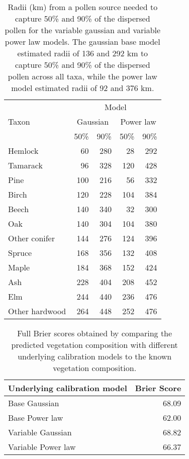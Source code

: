 \begin{table}
\begin{center}
\begin{tabular}{lrrrr} 
\toprule
      & \multicolumn{4}{c}{Model} \\  \cmidrule(lr){2-5}
Taxon & \multicolumn{2}{c}{Gaussian} & \multicolumn{2}{c}{Power law} \\  \cmidrule(lr){2-3}  \cmidrule(lr){4-5}
      & 50\% & 90\% & 50\% & 90\% \\
\cmidrule(lr){2-3}  \cmidrule(lr){4-5}
Hemlock        & 60  & 280 & 28  & 292 \\
Tamarack       &  96 & 328 & 120 & 428 \\
Pine           & 100 & 216 & 56  & 332 \\
Birch          & 120 & 228 & 104 & 384 \\
Beech          & 140 & 340 & 32  & 300 \\
Oak            & 140 & 304 & 104 & 380 \\
Other conifer  & 144 & 276 & 124 & 396 \\ 
Spruce         & 168 & 356 & 132 & 408 \\
Maple          & 184 & 368 & 152 & 424 \\
Ash            & 228 & 404 & 208 & 452 \\
Elm            & 244 & 440 & 236 & 476 \\
Other hardwood & 264 & 448 & 252 & 476 \\
 \bottomrule
\end{tabular}
\caption{Radii (km) from a pollen source needed to capture 50\% and 90\% of
  the dispersed pollen for the variable gaussian and variable power
  law models. The gaussian base model estimated radii of 136 and 292
  km to capture 50\% and 90\% of the dispersed pollen across all taxa, while the power
  law model estimated radii of 92 and 376 km.}
\end{center}
\label{table:pollen_acc}
\vspace{2cm}
\end{table}


\begin{table}
\begin{center}
\begin{tabular}{lr} 
\toprule
Underlying calibration model & Brier Score \\
\midrule
Base Gaussian      & 68.09 \\
Base Power law     & 62.00 \\
Variable Gaussian  & 68.82 \\
Variable Power law & 66.37 \\
 \bottomrule
\end{tabular}
\caption{Full Brier scores obtained by comparing the predicted
  vegetation composition with different underlying calibration models
  to the known vegetation composition.}
\end{center}
\label{table:brier}
\vspace{2cm}
\end{table}


